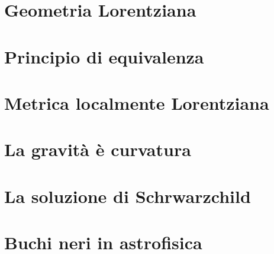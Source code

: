 

 \label{chap:buchi neri}
\minitoc\mtcskip

\noindent 

\section{Geometria Lorentziana}

\section{Principio di equivalenza}

\section{Metrica localmente Lorentziana}

\section{La gravit\`a \`e curvatura}

\section{La soluzione di Schrwarzchild}

\section{Buchi neri in astrofisica}

